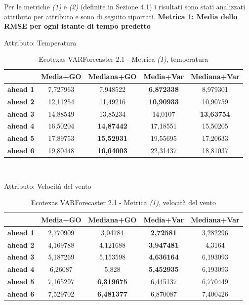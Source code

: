 \documentclass[12pt,a4paper,oneside,openright]{book}
\begin{document}
Per le metriche \textit{(1)} e \textit{(2)} (definite in Sezione 4.1) i risultati sono stati analizzati attributo per attributo e sono di seguito riportati.
\newpage
\textbf{Metrica 1: Media dello RMSE per ogni istante di tempo predetto} \medskip

Attributo: Temperatura \\ 
\begin{table}[H]
\centering
\begin{tabular}{|c|c|c|c|c|}
\hline
 & \textbf{Media+GO} & \textbf{Mediana+GO} & \textbf{Media+Var} & \textbf{Mediana+Var} \\
\hline
\textbf{ahead 1} & 7,727963 & 7,948522 & \textbf{6,872338} & 8,979301 \\
\hline
\textbf{ahead 2} & 12,11254 & 11,49216 & \textbf{10,90933} & 10,90759 \\
\hline
\textbf{ahead 3} & 14,88549 & 13,85234 & 14,0107 & \textbf{13,63754} \\
\hline
\textbf{ahead 4} & 16,50204 & \textbf{14,87442} & 17,18551 & 15,50205 \\
\hline
\textbf{ahead 5} & 17,89753 & \textbf{15,52931} & 19,55695 & 17,20633 \\
\hline
\textbf{ahead 6} & 19,80448 & \textbf{16,64003} & 22,31437 & 18,81037 \\
\hline
\end{tabular} \\
\caption{Ecotexas VARForecaster 2.1 - Metrica \textit{(1)}, temperatura}
\end{table} 

\medskip

Attributo: Velocità del vento \\ 

\begin{table}[H]
\centering
\begin{tabular}{|c|c|c|c|c|}
\hline
 & \textbf{Media+GO} & \textbf{Mediana+GO} & \textbf{Media+Var} & \textbf{Mediana+Var} \\
\hline
\textbf{ahead 1} & 2,770909 & 3,04784 & \textbf{2,72581} & 3,282296 \\
\hline
\textbf{ahead 2} & 4,169788 & 4,121688 & \textbf{3,947481} & 4,3164 \\
\hline
\textbf{ahead 3} & 5,187269 & 5,153598 & \textbf{4,636164} & 6,193093 \\
\hline
\textbf{ahead 4} & 6,26087 & 5,828 & \textbf{5,452935} & 6,193093 \\
\hline
\textbf{ahead 5} & 7,165297 & \textbf{6,319675} & 6,445137 & 6,770449 \\
\hline
\textbf{ahead 6} & 7,529702 & \textbf{6,481377} & 6,870087 & 7,400426 \\
\hline
\end{tabular} \\
\caption{Ecotexas VARForecaster 2.1 - Metrica \textit{(1)}, velocità del vento}
\end{table}
\end{document}

